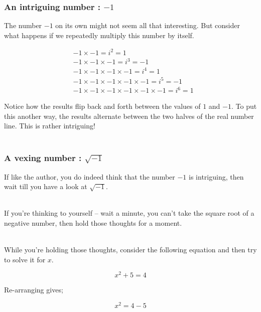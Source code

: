 
%
%

\begin{frame}
\frametitle{An intriguing number : \(-1\)}

The number \(-1\) on its own might not seem all that interesting. But consider what happens if we repeatedly multiply this number by itself.

\begin{align*}
& -1 \times -1 = i^{2} = 1  \\
& -1 \times -1 \times -1 = i^{3} = -1  \\
& -1 \times -1 \times -1 \times -1 = i^{4} = 1  \\
& -1 \times -1 \times -1 \times -1 \times -1 = i^{5} = -1  \\
& -1 \times -1 \times -1 \times -1 \times -1 \times -1 = i^{6} = 1
\end{align*}

Notice how the results flip back and forth between the values of \(1\) and \(-1\). To put this another way, the results alternate between the two halves of the
real number line. This is rather intriguing! \\~\

\end{frame}


%
%

\begin{frame}
\frametitle{A vexing number : \(\sqrt{-1}\)}

If like the author, you do indeed think that the number \(-1\) is intriguing, then wait till you have a look at \(\sqrt{-1}\).\\~\

If you're thinking to yourself -- wait a minute, you can't take the square root of a negative number, then hold those thoughts for a moment.\\~\

While you're holding those thoughts, consider the following equation and then try to solve it for \(x\).

\begin{equation}
  x^{2} + 5 = 4
\end{equation}

Re-arranging gives;

\begin{equation}
  x^{2} = 4 - 5
\end{equation}

\end{frame}


